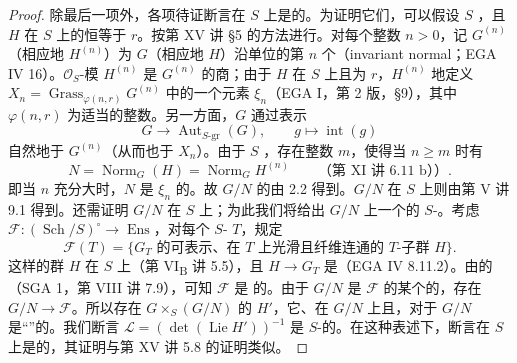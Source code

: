 \begin{proof}
除最后一项外，各项待证断言在 $S$ 上是的。为证明它们，可以假设 $S$ ，且 $H$ 在 $S$ 上的恒等于 $r$。按第 XV 讲 §5 的方法进行。对每个整数 $n>0$，记 $G^{(n)}$（相应地 $H^{(n)}$）为 $G$（相应地 $H$）沿单位的第 $n$ 个（invariant normal；EGA IV 16）。$\mathscr O_S$-模 $H^{(n)}$ 是 $G^{(n)}$ 的商；由于 $H$ 在 $S$ 上且为 $r$，$H^{(n)}$ 地定义 $X_n=\operatorname{Grass}_{\varphi(n,r)}G^{(n)}$ 中的一个元素 $\xi_n$（EGA I，第 2 版，§9），其中 $\varphi(n,r)$ 为适当的整数。另一方面，$G$ 通过表示
\[G\longrightarrow\operatorname{Aut}_{S\text{-gr}}(G),\qquad g\longmapsto\operatorname{int}(g)\]
自然地于 $G^{(n)}$（从而也于 $X_n$）。由于 $S$ ，存在整数 $m$，使得当 $n\ge m$ 时有
\[N=\operatorname{Norm}_G(H)=\operatorname{Norm}_G H^{(n)}\qquad\text{（第 XI 讲 6.11 b））}.\]
即当 $n$ 充分大时，$N$ 是 $\xi_n$ 的。故 $G/N$ 的由 2.2 得到。$G/N$ 在 $S$ 上则由第 V 讲 9.1 得到。还需证明 $G/N$ 在 $S$ 上；为此我们将给出 $G/N$ 上一个的 $S$-。考虑 $\mathscr F:(\operatorname{Sch}/S)^\circ\to\operatorname{Ens}$，对每个 $S$- $T$，规定
\[
\mathscr F(T)=\{\text{$G_T$ 的可表示、在 $T$ 上光滑且纤维连通的 $T$-子群 $H$}\}.
\]
这样的群 $H$ 在 $S$ 上（第 VI\textsubscript{B} 讲 5.5），且 $H\to G_T$ 是（EGA IV 8.11.2）。由的（SGA 1，第 VIII 讲 7.9），可知 $\mathscr F$ 是 的。由于 $G/N$ 是 $\mathscr F$ 的某个的，存在 $G/N\to\mathscr F$。所以存在 $G\times_S(G/N)$ 的 $H'$，它、在 $G/N$ 上且，对于 $G/N$ 是“”的。我们断言 $\mathscr L=(\det(\operatorname{Lie}H'))^{-1}$ 是 $S$-的。在这种表述下，断言在 $S$ 上是的，其证明与第 XV 讲 5.8 的证明类似。
\end{proof}
